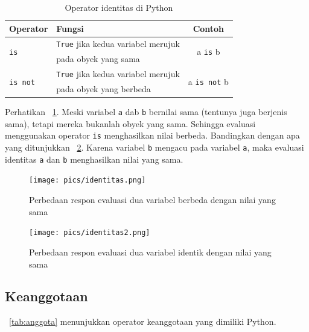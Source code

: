 \begin{table}[h]
\caption{Operator identitas di Python}
\label{tab:identitas}
  \begin{center}
    \begin{tabular}{@{}llc@{}}\toprule
    Operator & Fungsi  & Contoh\\ \midrule
    \multirow{2}{*}{\texttt{is}} & \texttt{True} jika kedua variabel merujuk  & \multirow{2}{*}{a \texttt{is} b} \\
    & pada obyek yang sama & \\
    \multirow{2}{*}{\texttt{is not}} & \texttt{True} jika kedua variabel merujuk & \multirow{2}{*}{a \texttt{is not} b} \\
    & pada obyek yang berbeda &\\
       \bottomrule
    \end{tabular}
  \end{center}
\end{table}

Perhatikan \figurename~\ref{fig:identitas}. Meski variabel \texttt{a} dab \texttt{b} bernilai sama (tentunya juga berjenis sama), tetapi mereka bukanlah obyek yang sama. Sehingga evaluasi menggunakan operator \texttt{is} menghasilkan nilai berbeda. Bandingkan dengan apa yang ditunjukkan \figurename~\ref{fig:identitas2}. Karena variabel \texttt{b} mengacu pada variabel \texttt{a}, maka evaluasi identitas \texttt{a} dan \texttt{b} menghasilkan nilai yang sama.

\begin{figure}
  \begin{center}
    \texttt{[image: pics/identitas.png]}
    \caption{Perbedaan respon evaluasi dua variabel berbeda dengan nilai yang sama}
    \label{fig:identitas}
  \end{center}
\end{figure}

\begin{figure}
  \begin{center}
    \texttt{[image: pics/identitas2.png]}
    \caption{Perbedaan respon evaluasi dua variabel identik dengan nilai yang sama}
    \label{fig:identitas2}
  \end{center}
\end{figure}

\subsection{Keanggotaan}
\tablename~\ref{tab:anggota} menunjukkan operator keanggotaan yang dimiliki Python.

